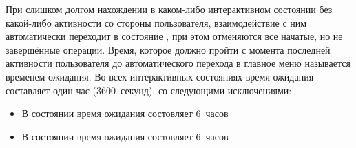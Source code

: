     При слишком долгом нахождении в каком-либо интерактивном состоянии без какой-либо активности
    со стороны пользователя, взаимодействие с ним автоматически переходит в состояние
    \hyperref[itm:req:ui:states:mainmenu]
    {}, при этом отменяются все начатые, но не завершённые операции.
    Время, которое должно пройти с момента последней активности пользователя до
    автоматического перехода в главное меню называется временем ожидания. Во всех интерактивных
    состояниях время ожидания составляет один час (3600~секунд), со следующими исключениями:
    \begin{itemize}
        \item
            В состоянии
            \hyperref[itm:req:ui:states:edit-note]
            {}
            время ожидания состовляет 6~часов
        \item
            В состоянии
            \hyperref[itm:req:ui:states:create-note]
            {}
            время ожидания состовляет 6~часов
    \end{itemize}
    \endgroup
